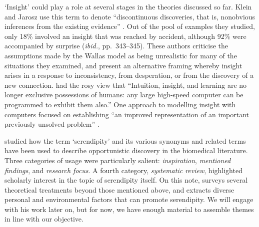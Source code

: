 `Insight' could play a role at several stages in the theories
discussed so far.  Klein and Jarosz use this term to denote
``discontinuous discoveries, that is, nonobvious inferences from the
existing evidence'' \cite[p.~335]{Klein2011}.  Out of the pool of
examples they studied, only 18\% involved an insight that was reached
by accident, although 92\% were accompanied by surprise (\emph{ibid.},
pp.~343--345).  These authors criticise the assumptions made by the
Wallas model as being unrealistic for many of the situations they
examined, and present an alternative framing whereby insight arises in
a response to inconsistency, from desperation, or from the discovery
of a new connection.  \citet[p.~6]{simon1958heuristic} had the rosy
view that ``Intuition, insight, and learning are no longer exclusive
possessions of humans: any large high-speed computer can be programmed
to exhibit them also.''  One approach to modelling insight with
computers focused on establishing ``an improved representation of an
important previously unsolved problem''
\cite[p.~118]{demystification}.

\citet{Allen:2013:LOD:2655780.2655790} studied how the term
`serendipity' and its various synonyms and related terms have been
used to describe opportunistic discovery in the biomedical literature.
Three categories of usage were particularly salient:
\emph{inspiration}, \emph{mentioned findings}, and \emph{research
  focus}.  A fourth category, \emph{systematic review}, highlighted
scholarly interest in the topic of serendipity itself.
On this note, \citet{bjorneborn2017three} surveys several theoretical
treatments beyond those mentioned above, and extracts diverse personal
and environmental factors that can promote serendipity.  We will
engage with his work later on, but for now, we have enough material to
assemble themes in line with our objective.

